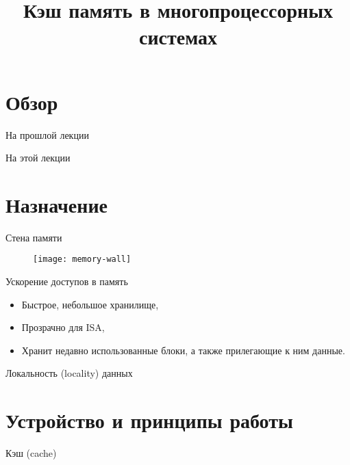 

\title{Кэш память в многопроцессорных системах}



\begin{frame}
\titlepage
\end{frame}

\section*{Обзор}

\begin{frame}{На прошлой лекции}
\end{frame}

\begin{frame}{На этой лекции}
\tableofcontents
\end{frame}

\section{Назначение}

\begin{frame}{Стена памяти}
\begin{figure}
    \centering
    \texttt{[image: memory-wall]}
\end{figure}
\end{frame}

\begin{frame}{Ускорение доступов в память}
\begin{itemize}
    \item Быстрое, небольшое хранилище,
    \item Прозрачно для ISA,
    \item Хранит недавно использованные блоки, а также прилегающие к ним данные.
\end{itemize}
\end{frame}

\begin{frame}{Локальность (\abbr locality) данных}
\centering
{}
\end{frame}

\section{Устройство и принципы работы}

\begin{frame}{Кэш (\abbr cache)}
\centering
{}
\end{frame}

